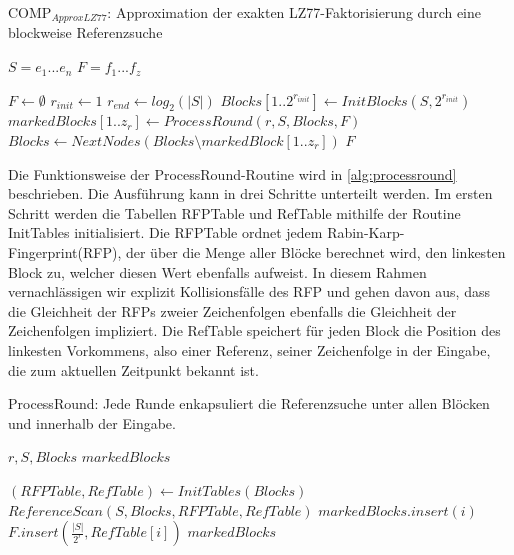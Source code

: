 \begin{algorithm}[ht]
\centering
\caption{COMP$_{ApproxLZ77}$: Approximation der exakten LZ77-Faktorisierung durch eine blockweise Referenzsuche} \label{alg:compapproxlz77}
\algorithmicrequire $S=e_1...e_n$
\algorithmicensure $F=f_1...f_z$
\begin{algorithmic}[1]
    \STATE $F \gets \emptyset$
    \STATE $r_{init} \gets 1$
    \STATE $r_{end} \gets log_2(|S|)$
    \STATE $Blocks[1..2^{r_{init}}] \gets InitBlocks(S, 2^{r_{init}})$ 
        \STATE $markedBlocks[1..z_r] \gets ProcessRound(r, S, Blocks, F)$
        \STATE $Blocks \gets NextNodes(Blocks\setminus markedBlock[1..z_r])$ 
    \ENDFOR
    \RETURN $F$
\end{algorithmic}
\end{algorithm}

Die Funktionsweise der ProcessRound-Routine wird in \ref{alg:processround} beschrieben. Die Ausführung kann in drei Schritte unterteilt werden. Im ersten Schritt werden die Tabellen RFPTable und RefTable
mithilfe der Routine InitTables initialisiert. Die RFPTable ordnet jedem Rabin-Karp-Fingerprint(RFP), der über die Menge aller Blöcke berechnet wird, den linkesten Block zu, welcher diesen 
Wert ebenfalls aufweist. In diesem Rahmen vernachlässigen wir explizit Kollisionsfälle des RFP und gehen davon aus, dass die Gleichheit der RFPs zweier Zeichenfolgen ebenfalls die Gleichheit der Zeichenfolgen
impliziert. Die RefTable speichert für jeden Block die Position des linkesten Vorkommens, also einer Referenz, seiner Zeichenfolge in der Eingabe, die zum aktuellen Zeitpunkt bekannt ist.

\begin{algorithm}[ht]
    \centering
    \caption{ProcessRound: Jede Runde enkapsuliert die Referenzsuche unter allen Blöcken und innerhalb der Eingabe.} \label{alg:processround}
    \algorithmicrequire $r, S, Blocks$
    \algorithmicensure $markedBlocks$
    \begin{algorithmic}[1]
        \STATE $(RFPTable, RefTable) \gets InitTables(Blocks)$
        \STATE $ReferenceScan(S, Blocks, RFPTable, RefTable)$
                \STATE $markedBlocks.insert(i)$
                \STATE $F.insert(\frac{|S|}{2^r}, RefTable[i])$ 
            \ENDIF
        \ENDFOR
        \RETURN $markedBlocks$
    \end{algorithmic}
\end{algorithm}

